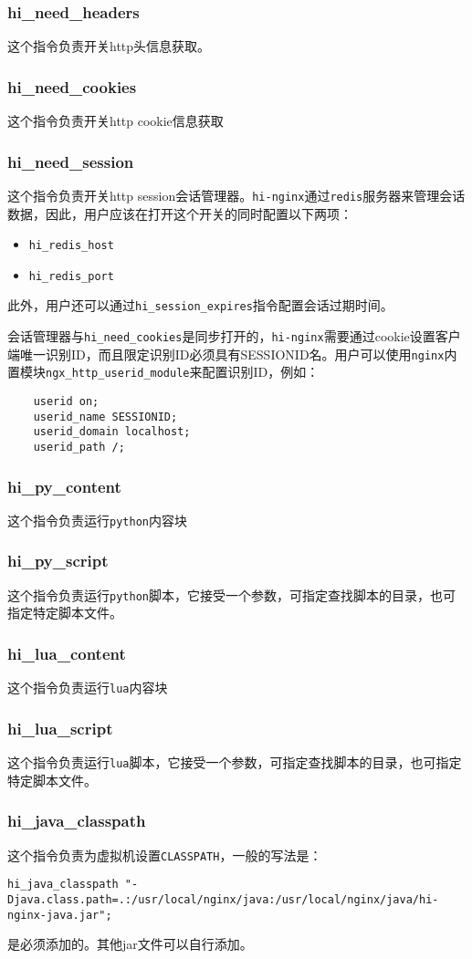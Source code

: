 \subsubsection{hi_need_headers}
这个指令负责开关http头信息获取。
\subsubsection{hi_need_cookies}
这个指令负责开关http cookie信息获取
\subsubsection{hi_need_session}
这个指令负责开关http session会话管理器。\texttt{hi-nginx}通过\texttt{redis}服务器来管理会话数据，因此，用户应该在打开这个开关的同时配置以下两项：
\begin{itemize}
\item \texttt{hi_redis_host}
\item \texttt{hi_redis_port}
\end{itemize}
此外，用户还可以通过\texttt{hi_session_expires}指令配置会话过期时间。

会话管理器与\texttt{hi_need_cookies}是同步打开的，\texttt{hi-nginx}需要通过cookie设置客户端唯一识别ID，而且限定识别ID必须具有SESSIONID名。用户可以使用\texttt{nginx}内置模块\texttt{ngx_http_userid_module}来配置识别ID，例如：
\begin{lstlisting}
	userid on;
	userid_name SESSIONID;
	userid_domain localhost;
	userid_path /;
\end{lstlisting}
\subsubsection{hi_py_content}
这个指令负责运行\texttt{python}内容块
\subsubsection{hi_py_script}
这个指令负责运行\texttt{python}脚本，它接受一个参数，可指定查找脚本的目录，也可指定特定脚本文件。
\subsubsection{hi_lua_content}
这个指令负责运行\texttt{lua}内容块
\subsubsection{hi_lua_script}
这个指令负责运行\texttt{lua}脚本，它接受一个参数，可指定查找脚本的目录，也可指定特定脚本文件。
\subsubsection{hi_java_classpath}
这个指令负责为虚拟机设置\texttt{CLASSPATH}，一般的写法是：
\begin{lstlisting}
hi_java_classpath "-Djava.class.path=.:/usr/local/nginx/java:/usr/local/nginx/java/hi-nginx-java.jar";
\end{lstlisting}
是必须添加的。其他jar文件可以自行添加。

